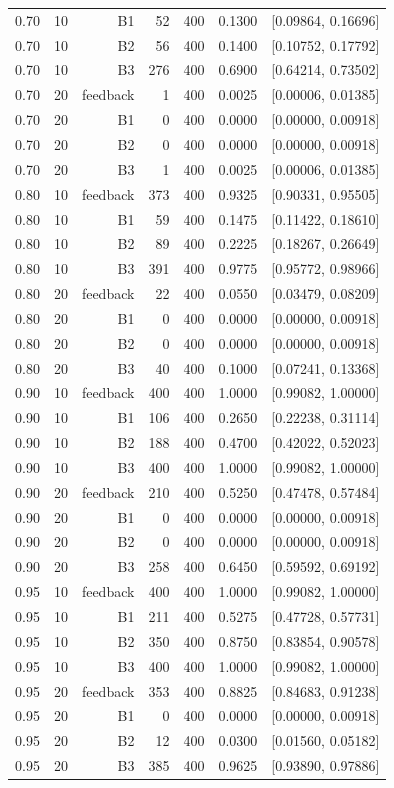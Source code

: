 \documentclass[10pt]{article}
\begin{document}
\begin{longtable}{lrrrrrr}
0.70 & 10 & B1 & 52 & 400 & 0.1300 & [0.09864, 0.16696] \\
0.70 & 10 & B2 & 56 & 400 & 0.1400 & [0.10752, 0.17792] \\
0.70 & 10 & B3 & 276 & 400 & 0.6900 & [0.64214, 0.73502] \\
0.70 & 20 & feedback & 1 & 400 & 0.0025 & [0.00006, 0.01385] \\
0.70 & 20 & B1 & 0 & 400 & 0.0000 & [0.00000, 0.00918] \\
0.70 & 20 & B2 & 0 & 400 & 0.0000 & [0.00000, 0.00918] \\
0.70 & 20 & B3 & 1 & 400 & 0.0025 & [0.00006, 0.01385] \\
0.80 & 10 & feedback & 373 & 400 & 0.9325 & [0.90331, 0.95505] \\
0.80 & 10 & B1 & 59 & 400 & 0.1475 & [0.11422, 0.18610] \\
0.80 & 10 & B2 & 89 & 400 & 0.2225 & [0.18267, 0.26649] \\
0.80 & 10 & B3 & 391 & 400 & 0.9775 & [0.95772, 0.98966] \\
0.80 & 20 & feedback & 22 & 400 & 0.0550 & [0.03479, 0.08209] \\
0.80 & 20 & B1 & 0 & 400 & 0.0000 & [0.00000, 0.00918] \\
0.80 & 20 & B2 & 0 & 400 & 0.0000 & [0.00000, 0.00918] \\
0.80 & 20 & B3 & 40 & 400 & 0.1000 & [0.07241, 0.13368] \\
0.90 & 10 & feedback & 400 & 400 & 1.0000 & [0.99082, 1.00000] \\
0.90 & 10 & B1 & 106 & 400 & 0.2650 & [0.22238, 0.31114] \\
0.90 & 10 & B2 & 188 & 400 & 0.4700 & [0.42022, 0.52023] \\
0.90 & 10 & B3 & 400 & 400 & 1.0000 & [0.99082, 1.00000] \\
0.90 & 20 & feedback & 210 & 400 & 0.5250 & [0.47478, 0.57484] \\
0.90 & 20 & B1 & 0 & 400 & 0.0000 & [0.00000, 0.00918] \\
0.90 & 20 & B2 & 0 & 400 & 0.0000 & [0.00000, 0.00918] \\
0.90 & 20 & B3 & 258 & 400 & 0.6450 & [0.59592, 0.69192] \\
0.95 & 10 & feedback & 400 & 400 & 1.0000 & [0.99082, 1.00000] \\
0.95 & 10 & B1 & 211 & 400 & 0.5275 & [0.47728, 0.57731] \\
0.95 & 10 & B2 & 350 & 400 & 0.8750 & [0.83854, 0.90578] \\
0.95 & 10 & B3 & 400 & 400 & 1.0000 & [0.99082, 1.00000] \\
0.95 & 20 & feedback & 353 & 400 & 0.8825 & [0.84683, 0.91238] \\
0.95 & 20 & B1 & 0 & 400 & 0.0000 & [0.00000, 0.00918] \\
0.95 & 20 & B2 & 12 & 400 & 0.0300 & [0.01560, 0.05182] \\
0.95 & 20 & B3 & 385 & 400 & 0.9625 & [0.93890, 0.97886] \\
\bottomrule\end{longtable}\normalsize
\end{document}
